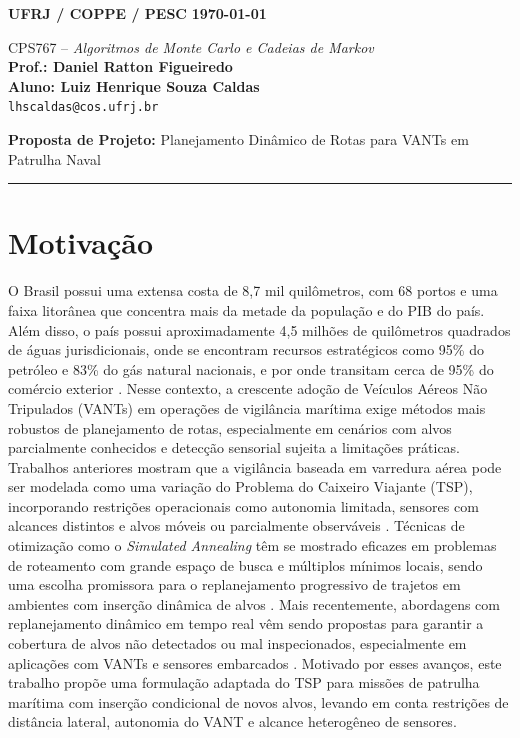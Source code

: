 \documentclass[12 pt]{article}
\begin{document}
\noindent
\textbf{UFRJ / COPPE / PESC} \hfill \textbf{\today} \\



\begin{center}
CPS767 – \textit{Algoritmos de Monte Carlo e Cadeias de Markov}\\
\textbf{Prof.: Daniel Ratton Figueiredo} \\[1em]
\textbf{Aluno: Luiz Henrique Souza Caldas}\\ \texttt{lhscaldas@cos.ufrj.br} \\[1em]

\end{center}

\textbf{Proposta de Projeto:} Planejamento Dinâmico de Rotas para VANTs em Patrulha Naval

\vspace{1em}
\hrule
\vspace{2em}


\section{Motivação}
O Brasil possui uma extensa costa de 8{,}7 mil quilômetros, com 68 portos e uma faixa litorânea que concentra mais da metade da população e do PIB do país. Além disso, o país possui aproximadamente 4{,}5 milhões de quilômetros quadrados de águas jurisdicionais, onde se encontram recursos estratégicos como 95\% do petróleo e 83\% do gás natural nacionais, e por onde transitam cerca de 95\% do comércio exterior \cite{andrade_2021}.
Nesse contexto, a crescente adoção de Veículos Aéreos Não Tripulados (VANTs) em operações de vigilância marítima exige métodos mais robustos de planejamento de rotas, especialmente em cenários com alvos parcialmente conhecidos e detecção sensorial sujeita a limitações práticas. Trabalhos anteriores mostram que a vigilância baseada em varredura aérea pode ser modelada como uma variação do Problema do Caixeiro Viajante (TSP), incorporando restrições operacionais como autonomia limitada, sensores com alcances distintos e alvos móveis ou parcialmente observáveis \cite{marlow_2007}.
Técnicas de otimização como o \textit{Simulated Annealing} têm se mostrado eficazes em problemas de roteamento com grande espaço de busca e múltiplos mínimos locais, sendo uma escolha promissora para o replanejamento progressivo de trajetos em ambientes com inserção dinâmica de alvos \cite{kosmas_2012}.
Mais recentemente, abordagens com replanejamento dinâmico em tempo real vêm sendo propostas para garantir a cobertura de alvos não detectados ou mal inspecionados, especialmente em aplicações com VANTs e sensores embarcados \cite{penicka_2017}. Motivado por esses avanços, este trabalho propõe uma formulação adaptada do TSP para missões de patrulha marítima com inserção condicional de novos alvos, levando em conta restrições de distância lateral, autonomia do VANT e alcance heterogêneo de sensores.
\end{document}
